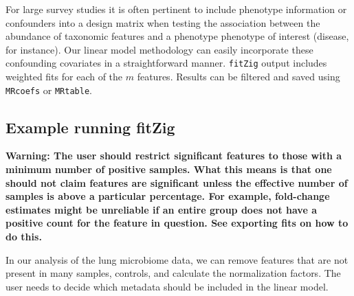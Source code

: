 \documentclass[a4paper,11pt]{article}\usepackage[]{graphicx}\usepackage[]{color}
\begin{document}
For large survey studies it is often pertinent to include phenotype information or confounders into a design matrix when testing the association between the abundance of taxonomic features and a phenotype phenotype of interest (disease, for
instance). Our linear model methodology can easily incorporate these
confounding covariates in a straightforward manner. \texttt{fitZig} output includes weighted fits for each of the $m$ features. Results can be filtered and saved using \texttt{MRcoefs} or \texttt{MRtable}.

\subsection{Example running fitZig}
\textbf{Warning: The user should restrict significant features to those with a minimum number of positive samples. What this means is that one should not claim features are significant unless the effective number of samples is above a particular percentage. For example, fold-change estimates might be unreliable if an entire group does not have a positive count for the feature in question. See exporting fits on how to do this.}

In our analysis of the lung microbiome data, we can remove features that are not present in many samples, controls, and calculate the normalization factors. The user needs to decide which metadata should be included in the linear model.
\end{document}
